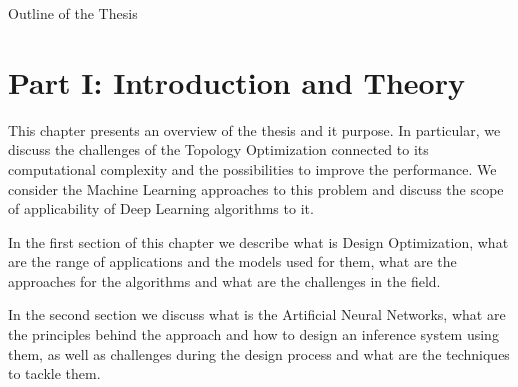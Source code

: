 \clearemptydoublepage

{}

\begin{center}
	\huge{Outline of the Thesis}
\end{center}


\section*{Part I: Introduction and Theory}

  \vspace{1mm}

\noindent  This chapter presents an overview of the thesis and it purpose. 
In particular, we discuss the challenges of the Topology Optimization connected to its computational complexity and the possibilities to improve the performance.
We consider the Machine Learning approaches to this problem and discuss the scope of applicability of Deep Learning algorithms to it.


  \vspace{1mm}

In the first section of this chapter we describe what is Design Optimization, what are the range of applications and the models used for them, what are the approaches for the algorithms and what are the challenges in the field.

In the second section we discuss what is the Artificial Neural Networks, what are the principles behind the approach and how to design an inference system using them, as well as challenges during the design process and what are the techniques to tackle them.



